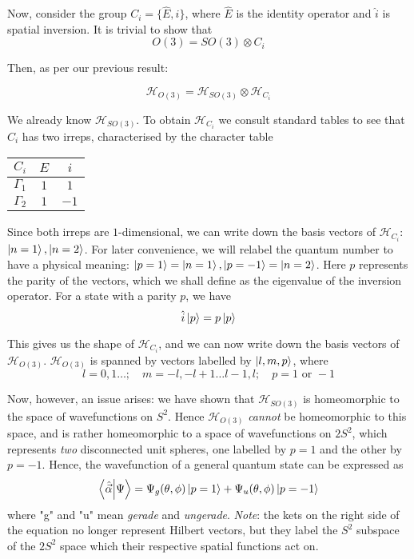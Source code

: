 \documentclass[12pt]{article}
\begin{document}
	Now, consider the group $C_i=\{\hat{E},\hat{i}\}$, where $\hat{E}$ is the identity operator and $\hat{i}$ is spatial inversion. It is trivial to show that
	$$O(3)=SO(3)\otimes C_i$$
	
	Then, as per our previous result:
	
	$$\mathcal{H}_{O(3)}=\mathcal{H}_{SO(3)}\otimes\mathcal{H}_{C_i}$$
	
	We already know $\mathcal{H}_{SO(3)}$. To obtain $\mathcal{H}_{C_i}$ we consult standard tables \cite[p.138]{altmann_inversion_group} to see that $C_i$ has two irreps, characterised by the character table
	
	\begin{center}
	\begin{tabular}{c | c c}
	$C_i$ & $E$ & $i$\\
	\hline
	$\Gamma_1$ & $1$ & $1$\\
	$\Gamma_2$ & $1$ & $-1$
	\end{tabular}
	\end{center}
	
	Since both irreps are $1$-dimensional, we can write down the basis vectors of $\mathcal{H}_{C_i}$: $\ket{n=1}, \ket{n=2}$. For later convenience, we will relabel the quantum number to have a physical meaning: $\ket{p=1}=\ket{n=1}, \ket{p=-1}=\ket{n=2}$. Here $p$ represents the parity of the vectors, which we shall define as the eigenvalue of the inversion operator. For a state with a parity $p$, we have 
	$$\hat{i}\ket{p}=p\ket{p}$$
	
	This gives us the shape of $\mathcal{H}_{C_i}$, and we can now write down the basis vectors of $\mathcal{H}_{O(3)}$. $\mathcal{H}_{O(3)}$ is spanned by vectors labelled by $\ket{l,m,p}$, where
	$$l=0, 1\dots;\quad m=-l,-l+1\dots l-1,l;\quad p=1\text{ or }-1$$
	
	Now, however, an issue arises: we have shown that $\mathcal{H}_{SO(3)}$ is homeomorphic to the space of wavefunctions on $S^2$. Hence $\mathcal{H}_{O(3)}$ \textit{cannot} be homeomorphic to this space, and is rather homeomorphic to a space of wavefunctions on $2S^2$, which represents \textit{two} disconnected unit spheres, one labelled by $p=1$ and the other by $p=-1$. Hence, the wavefunction of a general quantum state can be expressed as
	$$\braket{\hat{\vec{\alpha}}}{\Psi}=\Psi_g(\theta,\phi)\ket{p=1}+\Psi_u(\theta,\phi)\ket{p=-1}$$
	where "g" and "u" mean \textit{gerade} and \textit{ungerade}. \textit{Note}: the kets on the right side of the equation no longer represent Hilbert vectors, but they label the $S^2$ subspace of the $2S^2$ space which their respective spatial functions act on.
	
\end{document}
